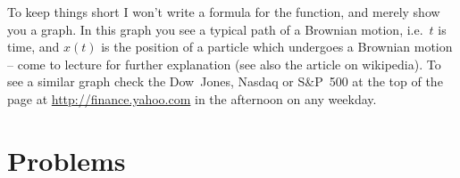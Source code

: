 To keep things short I won't write a formula for the function, and merely show
you a graph.  In this graph you see a typical path of a Brownian motion, i.e.\
$t$ is time, and $x(t)$ is the position of a particle which undergoes a Brownian
motion -- come to lecture for further explanation (see also the article on
wikipedia).  To see a similar graph check the Dow~Jones, Nasdaq or S\&P~500 at
the top of the page at \url{http://finance.yahoo.com} in the afternoon on any
weekday.


\section{Problems} 
\problemfont 

